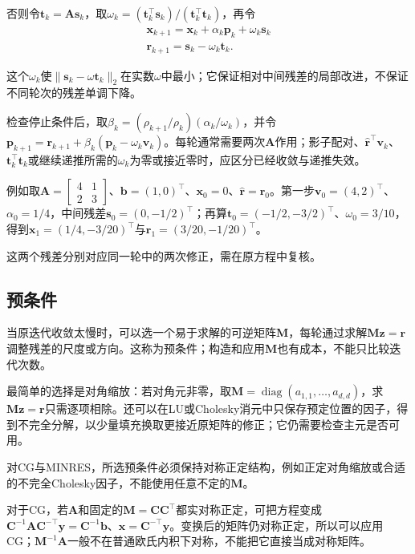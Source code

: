 否则令$\bm t_k=\bm A\bm s_k$，取$\omega_k=(\bm t_k^\top\bm s_k)/(\bm t_k^\top\bm t_k)$，再令
\[
 \begin{gathered}
\bm x_{k+1}=\bm x_k+\alpha_k\bm p_k+\omega_k\bm s_k\\
\bm r_{k+1}=\bm s_k-\omega_k\bm t_k.
 \end{gathered}
\]

这个$\omega_k$使$\lVert\bm s_k-\omega\bm t_k\rVert_2$在实数$\omega$中最小；它保证相对中间残差的局部改进，不保证不同轮次的残差单调下降。

检查停止条件后，取$\beta_k=(\rho_{k+1}/\rho_k)(\alpha_k/\omega_k)$，并令$\bm p_{k+1}=\bm r_{k+1}+\beta_k(\bm p_k-\omega_k\bm v_k)$。每轮通常需要两次$\bm A$作用；影子配对、$\widehat{\bm r}^\top\bm v_k$、$\bm t_k^\top\bm t_k$或继续递推所需的$\omega_k$为零或接近零时，应区分已经收敛与递推失效。

例如取$\bm A=\left[\begin{smallmatrix}4&1\\2&3\end{smallmatrix}\right]$、$\bm b=(1,0)^\top$、$\bm x_0=0$、$\widehat{\bm r}=\bm r_0$。第一步$\bm v_0=(4,2)^\top$、$\alpha_0=1/4$，中间残差$\bm s_0=(0,-1/2)^\top$；再算$\bm t_0=(-1/2,-3/2)^\top$、$\omega_0=3/10$，得到$\bm x_1=(1/4,-3/20)^\top$与$\bm r_1=(3/20,-1/20)^\top$。

这两个残差分别对应同一轮中的两次修正，需在原方程中复核。

\subsection{预条件}

当原迭代收敛太慢时，可以选一个易于求解的可逆矩阵$\bm M$，每轮通过求解$\bm M\bm z=\bm r$调整残差的尺度或方向。这称为预条件；构造和应用$\bm M$也有成本，不能只比较迭代次数。

最简单的选择是对角缩放：若对角元非零，取$\bm M=\operatorname{diag}(a_{1,1},\ldots,a_{d,d})$，求$\bm M\bm z=\bm r$只需逐项相除。还可以在LU或Cholesky消元中只保存预定位置的因子，得到不完全分解，以少量填充换取更接近原矩阵的修正；它仍需要检查主元是否可用。

对CG与MINRES，所选预条件必须保持对称正定结构，例如正定对角缩放或合适的不完全Cholesky因子，不能使用任意不定的$\bm M$。


对于CG，若$\bm A$和固定的$\bm M=\bm C\bm C^\top$都实对称正定，可把方程变成$\bm C^{-1}\bm A\bm C^{-\top}\bm y=\bm C^{-1}\bm b$、$\bm x=\bm C^{-\top}\bm y$。变换后的矩阵仍对称正定，所以可以应用CG；$\bm M^{-1}\bm A$一般不在普通欧氏内积下对称，不能把它直接当成对称矩阵。

